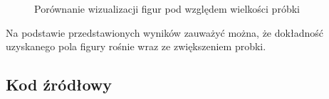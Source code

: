 \documentclass[a4paper,11pt,titlepage]{article}
\begin{document}
\begin{figure}[H]%
    \centering
    \qquad
    \caption{Porównanie wizualizacji figur pod względem wielkości próbki}%
    \label{fig:figs}%
\end{figure}

Na podstawie przedstawionych wyników zauważyć można, że dokładność uzyskanego pola figury rośnie wraz ze zwiększeniem probki.

\subsection{Kod źródłowy}

\end{document}
